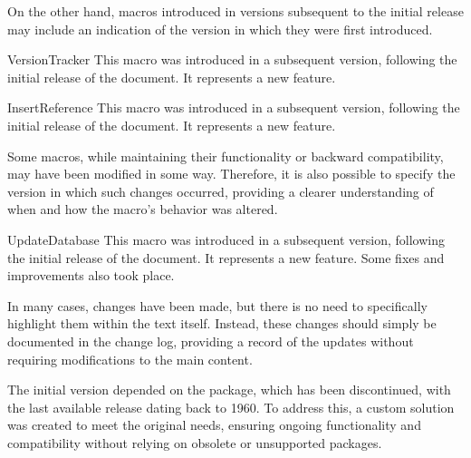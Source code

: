 \documentclass[a4paper, 11pt]{article}
\begin{document}
On the other hand, macros introduced in versions subsequent to the initial release may include an indication of the version in which they were first introduced.

\begin{DocsExample}
    \begin{Macro*}{VersionTracker}{}{}
        This macro was introduced in a subsequent version, following the initial release of the document. It represents a new feature.
    \end{Macro*}

    \begin{Macro*}{InsertReference}{}{}
        This macro was introduced in a subsequent version, following the initial release of the document. It represents a new feature.
    \end{Macro*}
\end{DocsExample}

Some macros, while maintaining their functionality or backward compatibility, may have been modified in some way. Therefore, it is also possible to specify the version in which such changes occurred, providing a clearer understanding of when and how the macro's behavior was altered.

\begin{DocsExample}
    \begin{Macro*}{UpdateDatabase}{}{}
        This macro was introduced in a subsequent version, following the initial release of the document. It represents a new feature. Some fixes and improvements also took place.
    \end{Macro*}
\end{DocsExample}

In many cases, changes have been made, but there is no need to specifically highlight them within the text itself. Instead, these changes should simply be documented in the change log, providing a record of the updates without requiring modifications to the main content.

\begin{DocsExample}
    The initial version depended on the  package, which has been discontinued, with the last available release dating back to 1960. To address this, a custom solution was created to meet the original needs, ensuring ongoing functionality and compatibility without relying on obsolete or unsupported packages.
\end{DocsExample}
\end{document}
